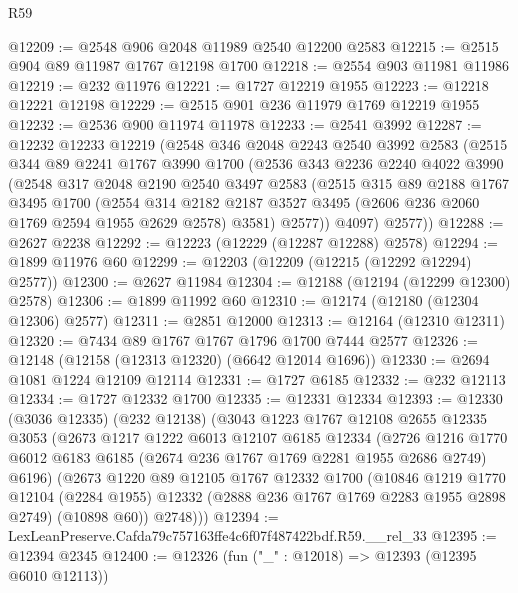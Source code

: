 \begin{lexlean}{R59}
\begin{coremodule}
@12209 := @2548 @906 @2048 @11989 @2540 @12200 @2583
@12215 := @2515 @904 @89 @11987 @1767 @12198 @1700
@12218 := @2554 @903 @11981 @11986
@12219 := @232 @11976
@12221 := @1727 @12219 @1955
@12223 := @12218 @12221 @12198
@12229 := @2515 @901 @236 @11979 @1769 @12219 @1955
@12232 := @2536 @900 @11974 @11978
@12233 := @2541 @3992
@12287 := @12232
    @12233
    @12219
    (@2548
      @346
      @2048
      @2243
      @2540
      @3992
      @2583
      (@2515
        @344
        @89
        @2241
        @1767
        @3990
        @1700
        (@2536
          @343
          @2236
          @2240
          @4022
          @3990
          (@2548
            @317
            @2048
            @2190
            @2540
            @3497
            @2583
            (@2515
              @315
              @89
              @2188
              @1767
              @3495
              @1700
              (@2554
                @314
                @2182
                @2187
                @3527
                @3495
                (@2606 @236 @2060 @1769 @2594 @1955 @2629 @2578)
                @3581)
              @2577))
          @4097)
        @2577))
@12288 := @2627 @2238
@12292 := @12223 (@12229 (@12287 @12288) @2578)
@12294 := @1899 @11976 @60
@12299 := @12203 (@12209 (@12215 (@12292 @12294) @2577))
@12300 := @2627 @11984
@12304 := @12188 (@12194 (@12299 @12300) @2578)
@12306 := @1899 @11992 @60
@12310 := @12174 (@12180 (@12304 @12306) @2577)
@12311 := @2851 @12000
@12313 := @12164 (@12310 @12311)
@12320 := @7434 @89 @1767 @1767 @1796 @1700 @7444 @2577
@12326 := @12148 (@12158 (@12313 @12320) (@6642 @12014 @1696))
@12330 := @2694 @1081 @1224 @12109 @12114
@12331 := @1727 @6185
@12332 := @232 @12113
@12334 := @1727 @12332 @1700
@12335 := @12331 @12334
@12393 := @12330
    (@3036 @12335)
    (@232 @12138)
    (@3043
      @1223
      @1767
      @12108
      @2655
      @12335
      @3053
      (@2673
        @1217
        @1222
        @6013
        @12107
        @6185
        @12334
        (@2726 @1216 @1770 @6012 @6183 @6185 (@2674 @236 @1767 @1769 @2281 @1955 @2686 @2749) @6196)
        (@2673
          @1220
          @89
          @12105
          @1767
          @12332
          @1700
          (@10846
            @1219
            @1770
            @12104
            (@2284 @1955)
            @12332
            (@2888 @236 @1767 @1769 @2283 @1955 @2898 @2749)
            (@10898 @60))
          @2748)))
@12394 := LexLeanPreserve.Cafda79c757163ffe4c6f07f487422bdf.R59.__rel_33
@12395 := @12394 @2345
@12400 := @12326 (fun ("_" : @12018) => @12393 (@12395 @6010 @12113))

\end{coremodule}
\end{lexlean}
